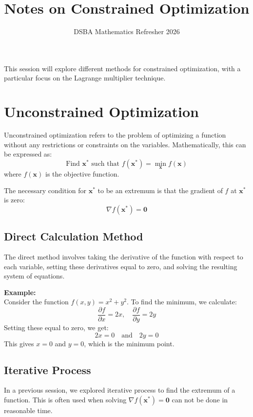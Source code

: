 \documentclass[]{article}
\title{Notes on Constrained Optimization}
\author{DSBA Mathematics Refresher 2026}
\date{}
\begin{document}
	
	\maketitle
	
	\begin{abstract}
		
	\end{abstract}
	
	This session will explore different methods for constrained optimization, with a particular focus on the Lagrange multiplier technique.
	
	\section{Unconstrained Optimization}
	
	Unconstrained optimization refers to the problem of optimizing a function without any restrictions or constraints on the variables.
	Mathematically, this can be expressed as:
	$$
	\text{Find } \mathbf{x}^* \text{ such that } f(\mathbf{x}^*) = \min_{\mathbf{x}} f(\mathbf{x})
	$$
	where $f(\mathbf{x})$ is the objective function.
	
	The necessary condition for \(\mathbf{x}^*\) to be an extremum is that the gradient of $f$ at $\mathbf{x}^*$ is zero:
	$$
	\nabla f(\mathbf{x}^*) = \mathbf{0}
	$$
	
	\subsection{Direct Calculation Method}
	The direct method involves taking the derivative of the function with respect to each variable, setting these derivatives equal to zero, and solving the resulting system of equations.
	
	\vspace{1cm}
	\textbf{Example:}
	\noindent\\
	Consider the function $f(x, y) = x^2 + y^2$. To find the minimum, we calculate:
	$$
	\frac{\partial f}{\partial x} = 2x, \quad \frac{\partial f}{\partial y} = 2y
	$$
	Setting these equal to zero, we get:
	$$
	2x = 0 \quad \text{and} \quad 2y = 0
	$$
	This gives $x = 0$ and $y = 0$, which is the minimum point.
	
	\subsection{Iterative Process}
	In a previous session, we explored iterative process to find the extremum of a function.
	This is often used when solving $\nabla f(\mathbf{x}^*) = \mathbf{0}$ can not be done in reasonable time.
	
\end{document}
